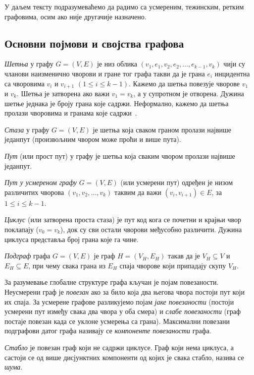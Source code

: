 У даљем тексту подразумеваћемо да радимо са усмереним, тежинским, ретким графовима, осим ако није другачије назначено.  

\subsection{Основни појмови и својства графова}

\textit{Шетња} у графу $G=(V,E)$ је низ облика $(v_1, e_1, v_2, e_2, \ldots , e_{k-1}, v_k)$ чији су чланови наизменично чворови и гране тог графа такви да је грана $e_i$ инцидентна са чворовима $v_i$ и $v_{i+1}$ $(1 \leq i \leq k-1)$. Кажемо да шетња повезује чворове $v_1$ и $v_k$. Шетња је затворена ако важи $v_1 = v_k$, а у супротном је отворена. Дужина шетње једнака је броју грана које садржи. Неформално, кажемо да шетња пролази чворовима и гранама које садржи~\cite{Stanic2020}.

\textit{Стаза} у графу $G=(V,E)$ је шетња која сваком граном пролази највише једанпут (произвољним чвором може проћи и више пута).

\textit{Пут} (или прост пут) у графу је шетња која сваким чвором пролази највише једанпут.

\textit{Пут у усмереном графу} $G=(V,E)$ (или усмерени пут) одређен је низом различитих чворова $(v_1, v_2, \dots , v_k)$ таквим да важи $(v_i, v_{i+1}) \in E$, за $1 \leq i \leq k - 1$.

\textit{Циклус} (или затворена проста стаза) је пут код кога се почетни и крајњи чвор поклапају ($v_0 = v_k$), док су сви остали чворови међусобно различити. Дужина циклуса представља број грана које га чине.

\textit{Подграф} графа $G=(V,E)$ је граф $H=(V_H, E_H)$ такав да је $V_H \subseteq V$ и $E_H \subseteq E$, при чему свака грана из $E_H$ спаја чворове који припадају скупу $V_H$. 

За разумевање глобалне структуре графа кључан је појам повезаности. Неусмерени граф је \textit{повезан} ако за било која два његова чвора постоји пут који их спаја. За усмерене графове разликујемо појам \textit{јаке повезаности} (постоји усмерени пут између свака два чвора у оба смера) и \textit{слабе повезаности} (граф постаје повезан када се уклоне усмерења са грана). Максимални повезани подграфови датог графа називају се \textit{компоненте повезаности} графа.


\textit{Стабло} је повезан граф који не садржи циклусе. Граф који нема циклуса, а састоји се од више дисјунктних компоненти од којих је свака стабло, назива се \textit{шума}.

